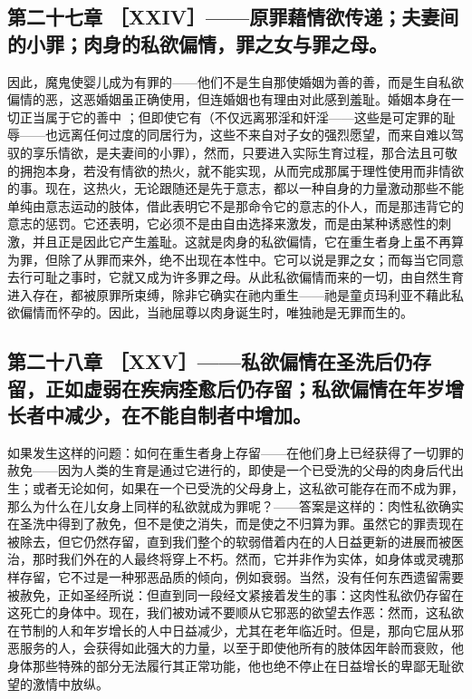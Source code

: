 
\subsection{第二十七章 ［XXIV］——原罪藉情欲传递；夫妻间的小罪；肉身的私欲偏情，罪之女与罪之母。}

因此，魔鬼使婴儿成为有罪的——他们不是生自那使婚姻为善的善，而是生自私欲偏情的恶，这恶婚姻虽正确使用，但连婚姻也有理由对此感到羞耻。婚姻本身在一切正当属于它的善中 ；但即使它有（不仅远离邪淫和奸淫——这些是可定罪的耻辱——也远离任何过度的同居行为，这些不来自对子女的强烈愿望，而来自难以驾驭的享乐情欲，是夫妻间的小罪），然而，只要进入实际生育过程，那合法且可敬的拥抱本身，若没有情欲的热火，就不能实现，从而完成那属于理性使用而非情欲的事。现在，这热火，无论跟随还是先于意志，都以一种自身的力量激动那些不能单纯由意志运动的肢体，借此表明它不是那命令它的意志的仆人，而是那违背它的意志的惩罚。它还表明，它必须不是由自由选择来激发，而是由某种诱惑性的刺激，并且正是因此它产生羞耻。这就是肉身的私欲偏情，它在重生者身上虽不再算为罪，但除了从罪而来外，绝不出现在本性中。它可以说是罪之女；而每当它同意去行可耻之事时，它就又成为许多罪之母。从此私欲偏情而来的一切，由自然生育进入存在，都被原罪所束缚，除非它确实在祂内重生——祂是童贞玛利亚不藉此私欲偏情而怀孕的。因此，当祂屈尊以肉身诞生时，唯独祂是无罪而生的。\par


\subsection{第二十八章 ［XXV］——私欲偏情在圣洗后仍存留，正如虚弱在疾病痊愈后仍存留；私欲偏情在年岁增长者中减少，在不能自制者中增加。}

如果发生这样的问题：如何在重生者身上存留——在他们身上已经获得了一切罪的赦免——因为人类的生育是通过它进行的，即使是一个已受洗的父母的肉身后代出生；或者无论如何，如果在一个已受洗的父母身上，这私欲可能存在而不成为罪，那么为什么在儿女身上同样的私欲就成为罪呢？——答案是这样的：肉性私欲确实在圣洗中得到了赦免，但不是使之消失，而是使之不归算为罪。虽然它的罪责现在被除去，但它仍然存留，直到我们整个的软弱借着内在的人日益更新的进展而被医治，那时我们外在的人最终将穿上不朽。然而，它并非作为实体，如身体或灵魂那样存留，它不过是一种邪恶品质的倾向，例如衰弱。当然，没有任何东西遗留需要被赦免，正如圣经所说：但直到同一段经文紧接着发生的事：这肉性私欲仍存留在这死亡的身体中。现在，我们被劝诫不要顺从它邪恶的欲望去作恶：然而，这私欲在节制的人和年岁增长的人中日益减少，尤其在老年临近时。但是，那向它屈从邪恶服务的人，会获得如此强大的力量，以至于即使他所有的肢体因年龄而衰败，他身体那些特殊的部分无法履行其正常功能，他也绝不停止在日益增长的卑鄙无耻欲望的激情中放纵。\par

